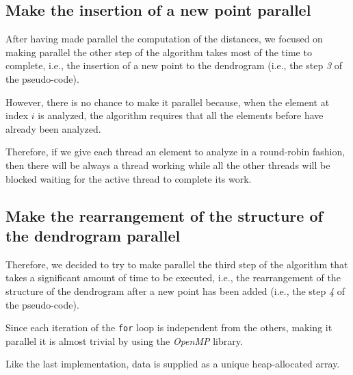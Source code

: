 \documentclass{article}
\begin{document}
\hypertarget{stage-3-parallel}{
    \subsection{Make the insertion of a new point parallel}
    \label{stage-3-parallel}}

After having made parallel the computation of the distances, we focused on making parallel the other
step of the algorithm takes most of the time to complete, i.e., the insertion of a new point to the dendrogram (i.e., the step \textit{3} of the pseudo-code).

However, there is no chance to make it parallel because, when the element at index $i$ is analyzed, the algorithm requires that all the elements before have already been analyzed.

Therefore, if we give each thread an element to analyze in a round-robin fashion, then there will
be always a thread working while all the other threads will be blocked waiting for the active
thread to complete its work.

\hypertarget{stage-4-parallel}{
    \subsection{Make the rearrangement of the structure of the dendrogram parallel}
    \label{stage-4-parallel}}

Therefore, we decided to try to make parallel the third step of the algorithm that takes a
significant amount of time to be executed, i.e., the rearrangement of the structure of the dendrogram after a new point has been added (i.e., the step \textit{4} of the pseudo-code).

Since each iteration of the \texttt{for} loop is independent from the others, making it parallel it is almost trivial by using the \emph{OpenMP} library.

Like the last implementation, data is supplied as a unique heap-allocated array.
\end{document}
